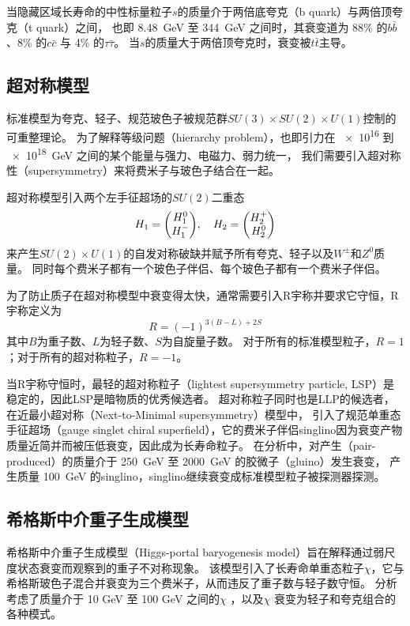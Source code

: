 当隐藏区域长寿命的中性标量粒子$s$的质量介于两倍底夸克（b quark）与两倍顶夸克（t quark）之间，
也即 \SI{8.48}{GeV} 至 \SI{344}{GeV} 之间时，其衰变道为 88\% 的$b \bar{b}$、8\% 的$c \bar{c}$ 与 4\% 的$\tau \bar{\tau}$。
当$s$的质量大于两倍顶夸克时，衰变被$t \bar{t}$主导。


\subsection{超对称模型}
标准模型为夸克、轻子、规范玻色子被规范群$SU(3)\times SU(2) \times U(1)$控制的可重整理论。
为了解释等级问题（hierarchy problem），也即引力在 \num{e16} 到 \SI{e18}{GeV} 之间的某个能量与强力、电磁力、弱力统一，
我们需要引入超对称性（supersymmetry）来将费米子与玻色子结合在一起。

超对称模型引入两个左手征超场的$SU(2)$二重态
$$H_1 = \mqty(H_1^0 \\ H_1^-) \qc H_2 = \mqty(H_2^+ \\ H_2^0) $$
来产生$SU(2) \times U(1)$的自发对称破缺并赋予所有夸克、轻子以及$W^\pm$和$Z^0$质量。
同时每个费米子都有一个玻色子伴侣、每个玻色子都有一个费米子伴侣。
\cite{QFT_Weinberg}

为了防止质子在超对称模型中衰变得太快，通常需要引入R宇称并要求它守恒，R宇称定义为
\begin{equation}
    R = (-1)^{3(B-L)+2S}
\end{equation}
其中$B$为重子数、$L$为轻子数、$S$为自旋量子数。
对于所有的标准模型粒子，$R=1$；对于所有的超对称粒子，$R=-1$。
\cite{SUSY_ATLAS}

当R宇称守恒时，最轻的超对称粒子（lightest supersymmetry particle, LSP）是稳定的，因此LSP是暗物质的优秀候选者。
超对称粒子同时也是LLP的候选者，在近最小超对称（Next-to-Minimal supersymmetry）模型中，
引入了规范单重态手征超场（gauge singlet chiral superfield），它的费米子伴侣singlino因为衰变产物质量近简并而被压低衰变，因此成为长寿命粒子。
\cite{singlino}
在分析中，对产生（pair-produced）的质量介于 \SI{250}{GeV} 至 \SI{2000}{GeV} 的胶微子（gluino）发生衰变，
产生质量 \SI{100}{GeV} 的singlino，singlino继续衰变成标准模型粒子被探测器探测。


\subsection{希格斯中介重子生成模型}
希格斯中介重子生成模型（Higgs-portal baryogenesis model）旨在解释通过弱尺度状态衰变而观察到的重子不对称现象。
该模型引入了长寿命单重态粒子$\chi$，它与希格斯玻色子混合并衰变为三个费米子，从而违反了重子数与轻子数守恒。
分析考虑了质量介于 10 GeV 至 100 GeV 之间的$\chi$ ，以及$\chi$ 衰变为轻子和夸克组合的各种模式。

